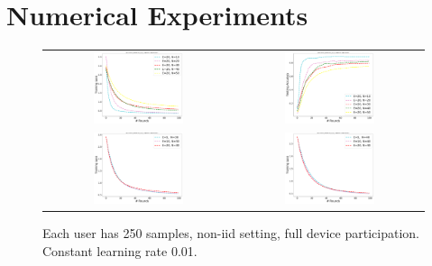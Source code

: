 


\section{Numerical Experiments}


\begin{figure}
\begin{tabular}{cc}
	\includegraphics[width=0.5\textwidth]{fig/synthetic_balance_0_0_loss.pdf} & 
	\includegraphics[width=0.5\textwidth]{fig/synthetic_balance_0_0_accuracy.pdf} \\
	\includegraphics[width=0.5\textwidth]{fig/synthetic_balance_0_0_lossuser30TuneE.pdf} & 
	\includegraphics[width=0.5\textwidth]{fig/synthetic_balance_0_0_lossuser40TuneE.pdf} \\
\end{tabular}
\caption{Each user has 250 samples, non-iid setting, full device participation. Constant learning rate 0.01.}
\end{figure}

